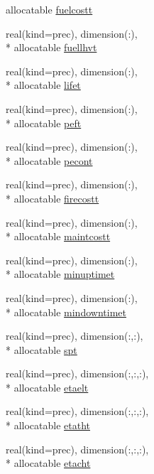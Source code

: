 \begin{DoxyCompactItemize}
allocatable \hyperlink{classinputvar_a85ccff6d868e650d2255bb9faa7c31be}{fuelcostt}
\item 
real(kind=prec), dimension(\-:), \\*
allocatable \hyperlink{classinputvar_afe467edd87c4c589d3ad9d5b14825f94}{fuellhvt}
\item 
real(kind=prec), dimension(\-:), \\*
allocatable \hyperlink{classinputvar_a04abed47801bdfcda1ecba21b90ab85b}{lifet}
\item 
real(kind=prec), dimension(\-:), \\*
allocatable \hyperlink{classinputvar_ab6d8921a6209783f0f51673c842f94b5}{peft}
\item 
real(kind=prec), dimension(\-:), \\*
allocatable \hyperlink{classinputvar_a1f575248c5370894cd5abbad18ace926}{pecont}
\item 
real(kind=prec), dimension(\-:), \\*
allocatable \hyperlink{classinputvar_a57526f25accbe0af7902997bd9cde614}{firecostt}
\item 
real(kind=prec), dimension(\-:), \\*
allocatable \hyperlink{classinputvar_abeac95d7e558ca06d4456187b380fdbc}{maintcostt}
\item 
real(kind=prec), dimension(\-:), \\*
allocatable \hyperlink{classinputvar_a90d0b599ed6468fc322cf2fbd6b4ec95}{minuptimet}
\item 
real(kind=prec), dimension(\-:), \\*
allocatable \hyperlink{classinputvar_aca351a4427897a65d991d46243fadc34}{mindowntimet}
\item 
real(kind=prec), dimension(\-:,\-:), \\*
allocatable \hyperlink{classinputvar_aa1da1474767137ee483ef4253b7cef85}{spt}
\item 
real(kind=prec), dimension(\-:,\-:,\-:), \\*
allocatable \hyperlink{classinputvar_af7479b2afabbd7d596d91bb1319b0a8e}{etaelt}
\item 
real(kind=prec), dimension(\-:,\-:,\-:), \\*
allocatable \hyperlink{classinputvar_a93c858e92300ce7dfc06627cbc72d681}{etatht}
\item 
real(kind=prec), dimension(\-:,\-:,\-:), \\*
allocatable \hyperlink{classinputvar_a7cd43a0a5d5ddb8d50af96d4c4f81bea}{etacht}
\item 

\end{DoxyCompactItemize}
